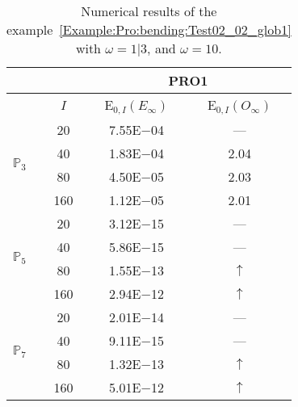 \begin{table}[H]
\caption{Numerical results of the example~\ref{Example:Pro:bending:Test02_02_glob1} with $\omega=1|3$, and $\omega=10$.}
\setlength{\tabcolsep}{5pt}
\centering
\begin{tabular}{@{}l c c c@{}}
\toprule
 &  & \multicolumn{2}{c}{PRO1}\\
\midrule
 & $I$ & E$_{0,I}(E_{\infty})$ & E$_{0,I}(O_{\infty})$\\
\midrule
\multirow{4}{*}{$\mathbb{P}_{3}$} & 20 & 7.55E$-$04 & ---\\
 & 40 & 1.83E$-$04 & 2.04\\
 & 80 & 4.50E$-$05 & 2.03\\
 & 160 & 1.12E$-$05 & 2.01\\
\midrule
\multirow{4}{*}{$\mathbb{P}_{5}$} & 20 & 3.12E$-$15 & ---\\
 & 40 & 5.86E$-$15 & ---\\
 & 80 & 1.55E$-$13 & $\uparrow$\\
 & 160 & 2.94E$-$12 & $\uparrow$\\
\midrule
\multirow{4}{*}{$\mathbb{P}_{7}$} & 20 & 2.01E$-$14 & ---\\
 & 40 & 9.11E$-$15 & ---\\
 & 80 & 1.32E$-$13 & $\uparrow$\\
 & 160 & 5.01E$-$12 & $\uparrow$\\
\bottomrule
\end{tabular}
\label{Table:PRO:test_02_02_test4}
\end{table}
